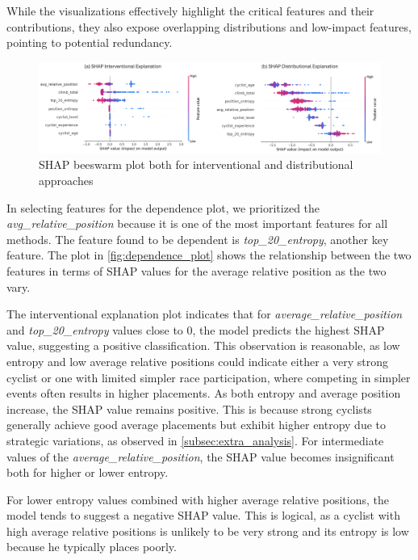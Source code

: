 While the visualizations effectively highlight the critical features and their contributions, they also expose overlapping distributions and low-impact features, pointing to potential redundancy. 

\begin{figure}[H]
    \centering
    \includegraphics[width=0.9\linewidth]{images//XAI/beeswarm.png}
    \caption{\small SHAP beeswarm plot both for interventional and distributional approaches}
    \label{fig:beeswarm}
\end{figure}

\noindent In selecting features for the dependence plot, we prioritized the \textit{avg\_relative\_position} because it is one of the most important features for all methods. The feature found to be dependent is \textit{top\_20\_entropy}, another key feature. The plot in \autoref{fig:dependence_plot} shows the relationship between the two features in terms of SHAP values for the average relative position as the two vary.

The interventional explanation plot indicates that for \textit{average\_relative\_position} and \textit{top\_20\_entropy} values close to 0, the model predicts the highest SHAP value, suggesting a positive classification. This observation is reasonable, as low entropy and low average relative positions could indicate either a very strong cyclist or one with limited simpler race participation, where competing in simpler events often results in higher placements. As both entropy and average position increase, the SHAP value remains positive. This is because strong cyclists generally achieve good average placements but exhibit higher entropy due to strategic variations, as observed in \autoref{subsec:extra_analysis}. For intermediate values of the \textit{average\_relative\_position}, the SHAP value becomes insignificant both for higher or lower entropy.

For lower entropy values combined with higher average relative positions, the model tends to suggest a negative SHAP value. This is logical, as a cyclist with high average relative positions is unlikely to be very strong and its entropy is low because he typically places poorly.

